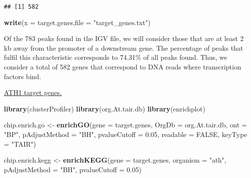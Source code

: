 \documentclass[
]{article}
\newenvironment{Shaded}{\begin{snugshade}}{\end{snugshade}}
\newcommand{\AttributeTok}[1]{\textcolor[rgb]{0.13,0.29,0.53}{#1}}
\newcommand{\ConstantTok}[1]{\textcolor[rgb]{0.56,0.35,0.01}{#1}}
\newcommand{\FloatTok}[1]{\textcolor[rgb]{0.00,0.00,0.81}{#1}}
\newcommand{\FunctionTok}[1]{\textcolor[rgb]{0.13,0.29,0.53}{\textbf{#1}}}
\newcommand{\NormalTok}[1]{#1}
\newcommand{\OtherTok}[1]{\textcolor[rgb]{0.56,0.35,0.01}{#1}}
\newcommand{\StringTok}[1]{\textcolor[rgb]{0.31,0.60,0.02}{#1}}
\begin{document}
\begin{verbatim}
## [1] 582
\end{verbatim}

\begin{Shaded}
\begin{Highlighting}[]
\FunctionTok{write}\NormalTok{(}\AttributeTok{x =}\NormalTok{ target.genes,}\AttributeTok{file =} \StringTok{"target\_genes.txt"}\NormalTok{)}
\end{Highlighting}
\end{Shaded}

Of the 783 peaks found in the IGV file, we will consider those that are
at least 2 kb away from the promoter of a downstream gene. The
percentage of peaks that fulfil this characteristic corresponds to
74.31\% of all peaks found. Thus, we consider a total of 582 genes that
correspond to DNA reads where transcription factors bind.

\href{target_genes.txt}{ATH1 target genes.}

\begin{Shaded}
\begin{Highlighting}[]
\FunctionTok{library}\NormalTok{(clusterProfiler)}
\FunctionTok{library}\NormalTok{(org.At.tair.db)}
\FunctionTok{library}\NormalTok{(enrichplot)}

\NormalTok{chip.enrich.go }\OtherTok{\textless{}{-}} \FunctionTok{enrichGO}\NormalTok{(}\AttributeTok{gene =}\NormalTok{ target.genes,}
                           \AttributeTok{OrgDb         =}\NormalTok{ org.At.tair.db,}
                           \AttributeTok{ont           =} \StringTok{"BP"}\NormalTok{,}
                           \AttributeTok{pAdjustMethod =} \StringTok{"BH"}\NormalTok{,}
                           \AttributeTok{pvalueCutoff  =} \FloatTok{0.05}\NormalTok{,}
                           \AttributeTok{readable      =} \ConstantTok{FALSE}\NormalTok{,}
                           \AttributeTok{keyType =} \StringTok{"TAIR"}\NormalTok{)}




\NormalTok{chip.enrich.kegg }\OtherTok{\textless{}{-}} \FunctionTok{enrichKEGG}\NormalTok{(}\AttributeTok{gene  =}\NormalTok{ target.genes,}
                               \AttributeTok{organism =} \StringTok{"ath"}\NormalTok{,}
                               \AttributeTok{pAdjustMethod =} \StringTok{"BH"}\NormalTok{,}
                               \AttributeTok{pvalueCutoff  =} \FloatTok{0.05}\NormalTok{)}
\end{Highlighting}
\end{Shaded}
\end{document}
